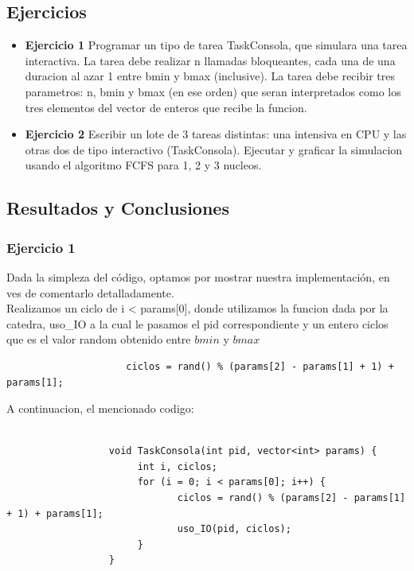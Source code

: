 
\subsection{Ejercicios}
\begin{itemize}
 \item \textbf{Ejercicio 1 } Programar un tipo de tarea TaskConsola, que simulara una tarea interactiva.
La tarea debe realizar n llamadas bloqueantes, cada una de una duracion al azar 1 entre bmin
y bmax (inclusive). La tarea debe recibir tres parametros: n, bmin y bmax (en ese orden) que
seran interpretados como los tres elementos del vector de enteros que recibe la funcion.
\item \textbf{Ejercicio 2} Escribir un lote de 3 tareas distintas: una intensiva en CPU y las otras dos de
tipo interactivo (TaskConsola). Ejecutar y graficar la simulacion usando el algoritmo FCFS
para 1, 2 y 3 nucleos.
\end{itemize}

\subsection{Resultados y Conclusiones}

\subsubsection[Resolución Ejercicio 1]{Ejercicio 1}

\indent Dada la simpleza del código, optamos por mostrar nuestra implementación, en ves de comentarlo detalladamente.\\
\indent Realizamos un ciclo de i < params[0], donde utilizamos la funcion dada por la catedra, uso\_IO a la cual le pasamos
el pid correspondiente y un entero ciclos que es el valor random obtenido entre $bmin$ y $bmax$ 
\begin{center}
 \begin{verbatim}
                     ciclos = rand() % (params[2] - params[1] + 1) + params[1];
 \end{verbatim}

\end{center}

\indent A continuacion, el mencionado codigo:

\begin{verbatim}

                  void TaskConsola(int pid, vector<int> params) {
                       int i, ciclos;              
                       for (i = 0; i < params[0]; i++) {
                              ciclos = rand() % (params[2] - params[1] + 1) + params[1];  
                              uso_IO(pid, ciclos);
                       }
                  } 

\end{verbatim}

